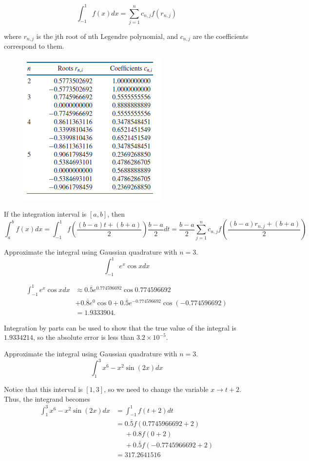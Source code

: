 \begin{thm} 
	\[\int_{-1}^{1} f(x)dx = \sum_{j=1}^n c_{n,j}f(r_{n,j}) \]
	
	where $r_{n,j}$ is the jth root of nth Legendre polynomial, and $c_{n,j}$ are the coefficients correspond to them.
	\begin{figure} [H]
		\centering
		\includegraphics{img/zeros_legendre_p} 
	\end{figure}
	
	If the integration interval is $[a,b]$, then
	\[\int_{a}^{b} f(x)dx = \int_{-1}^{1} f\left(\frac{(b-a)t+ (b+a)}{2}\right) \frac{b-a}{2}dt = \frac{b-a}{2} \sum_{j=1}^n c_{n,j}f\left( \frac{(b-a)r_{n,j}+ (b+a)}{2} \right)
	\]
\end{thm}

\begin{ex}
	Approximate the integral using Gaussian quadrature with $n=3$.
	\[ \int_{-1}^1 e^x\cos xdx \]
	\begin{solution}
		\begin{align*}
		\int_{-1}^1 e^x\cos xdx &\approx 0.\bar{5}e^{0.774596692}\cos 0.774596692\\
		&+ 0.\bar{8}e^0\cos 0 + 0.\bar{5}e^{-0.774596692}\cos(-0.774596692)\\
		&= 1.9333904. 
		\end{align*}
		
		Integration by parts can be used to show that the true value of the integral is $1.9334214$, so the absolute error is less than $3.2\times 10^{-5}$.
	\end{solution}
\end{ex}

\begin{ex}
	Approximate the integral using Gaussian quadrature with $n=3$.
	\[ \int_{1}^3 x^6 - x^2\sin(2x)dx \]
	\begin{solution}
		Notice that this interval is $[1,3]$, so we need to change the variable $x\to t+2$. Thus, the integrand becomes
		\begin{align*}
		\int_{1}^3 x^6 - x^2\sin(2x)dx &= \int_{-1}^{1} f(t+2) dt\\
		&= 0.\bar{5}f(0.7745966692 + 2) \\
		&\phantom{=}+ 0.8f(0+2)\\
		&\phantom{=}+ 0.\bar{5}f(-0.7745966692 + 2)\\
		&= 317.2641516
		\end{align*}
	\end{solution}
\end{ex}

